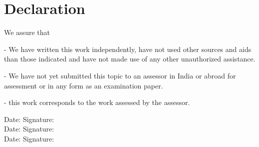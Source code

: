 \chapter*{Declaration}
\label{ch:declaration}

\begin{flushleft}
We assure that 
\end{flushleft}

\begin{flushleft}
- We have written this work independently, have not used other sources and aids than those indicated and have not made use of any other unauthorized assistance.
\end{flushleft}

\begin{flushleft}
- We have not yet submitted this topic to an assessor in India or abroad for assessment or in any form as an examination paper.
\end{flushleft}

\begin{flushleft}
- this work corresponds to the work assessed by the assessor.
\end{flushleft}

\vspace{1.5cm}

Date:	\hrulefill\enspace Signature: \hrulefill
\\[3.5cm]

Date:	\hrulefill\enspace Signature: \hrulefill
\\[3.5cm]

Date:	\hrulefill\enspace Signature: \hrulefill
\\[3.5cm]